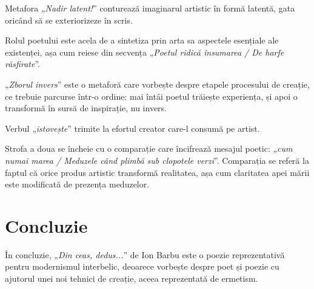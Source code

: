 \documentclass{article}
\newcommand{\qu}[1]{„\emph{#1}”}
\begin{document}
Metafora \qu{Nadir latent!} conturează imaginarul artistic în formă latentă, gata oricând să se exteriorizeze în scris.

Rolul poetului este acela de a sintetiza prin arta sa aspectele esențiale ale existenței, așa cum reiese din secvența \qu{Poetul ridică însumarea / De harfe răsfirate}.

\qu{Zborul invers} este o metaforă care vorbește despre etapele procesului de creație, ce trebuie parcurse într-o ordine: mai întâi poetul trăiește experiența, și apoi o transformă în sursă de inspirație, nu invers.

Verbul \qu{istovește} trimite la efortul creator care-l consumă pe artist.

Strofa a doua se încheie cu o comparație care încifrează mesajul poetic: \qu{cum numai marea / Meduzele când plimbă sub clopotele verzi}. Comparația se referă la faptul că orice produs artistic transformă realitatea, așa cum claritatea apei mării este modificată de prezența meduzelor.

\section{Concluzie}
În concluzie, \qu{Din ceas, dedus...} de Ion Barbu este o poezie reprezentativă pentru modernismul interbelic, deoarece vorbește despre poet și poezie cu ajutorul unei noi tehnici de creație, aceea reprezentată de ermetism.
\end{document}
